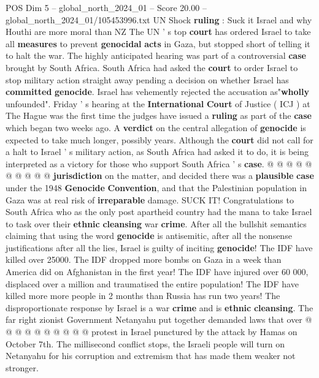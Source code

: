 \begin{textsample}{POS Dim 5 – global\_north\_2024\_01 – Score 20.00 – global\_north\_2024\_01/105453996.txt}  \label{ex:f5_pos_133}
UN Shock \textbf{ruling} : Suck it Israel and why Houthi are more moral than NZ The UN ' s top \textbf{court} has ordered Israel to take all \textbf{measures} to prevent \textbf{genocidal} \textbf{acts} in Gaza, but stopped short of telling it to halt the war.
The highly anticipated hearing was part of a controversial \textbf{case} brought by South Africa.
South Africa had asked the \textbf{court} to order Israel to stop military action straight away pending a decision on whether Israel has \textbf{committed} \textbf{genocide}.
Israel has vehemently rejected the accusation as"\textbf{wholly} unfounded".
Friday ' s hearing at the \textbf{International} \textbf{Court} of Justice ( ICJ ) at The Hague was the first time the judges have issued a \textbf{ruling} as part of the \textbf{case} which began two weeks ago.
A \textbf{verdict} on the central allegation of \textbf{genocide} is expected to take much longer, possibly years.
Although the \textbf{court} did not call for a halt to Israel ' s military action, as South Africa had asked it to do, it is being interpreted as a victory for those who support South Africa ' s \textbf{case}. @ @ @ @ @ @ @ @ @ @ \textbf{jurisdiction} on the matter, and decided there was a \textbf{plausible} \textbf{case} under the 1948 \textbf{Genocide} \textbf{Convention}, and that the Palestinian population in Gaza was at real risk of \textbf{irreparable} damage.
SUCK IT!
Congratulations to South Africa who as the only post apartheid country had the mana to take Israel to task over their \textbf{ethnic} \textbf{cleansing} war \textbf{crime}.
After all the bullshit semantics claiming that using the word \textbf{genocide} is antisemitic, after all the nonsense justifications after all the lies, Israel is guilty of inciting \textbf{genocide}!
The IDF have killed over 25000.
The IDF dropped more bombs on Gaza in a week than America did on Afghanistan in the first year!
The IDF have injured over 60 000, displaced over a million and traumatised the entire population!
The IDF have killed more more people in 2 months than Russia has run two years!
The disproportionate response by Israel is a war \textbf{crime} and is \textbf{ethnic} \textbf{cleansing}.
The far right zionist Government Netanyahu put together demanded laws that over @ @ @ @ @ @ @ @ @ @ protest in Israel punctured by the attack by Hamas on October 7th.
The millisecond conflict stops, the Israeli people will turn on Netanyahu for his corruption and extremism that has made them weaker not stronger.

\end{textsample}
